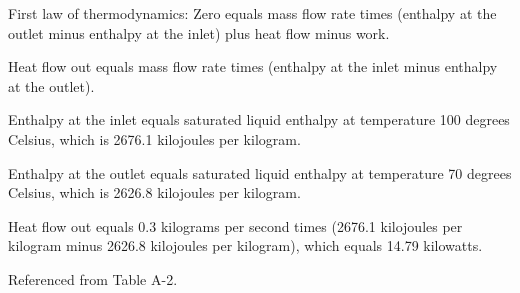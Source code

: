 First law of thermodynamics:  
Zero equals mass flow rate times (enthalpy at the outlet minus enthalpy at the inlet) plus heat flow minus work.  

Heat flow out equals mass flow rate times (enthalpy at the inlet minus enthalpy at the outlet).  

Enthalpy at the inlet equals saturated liquid enthalpy at temperature 100 degrees Celsius, which is 2676.1 kilojoules per kilogram.  

Enthalpy at the outlet equals saturated liquid enthalpy at temperature 70 degrees Celsius, which is 2626.8 kilojoules per kilogram.  

Heat flow out equals 0.3 kilograms per second times (2676.1 kilojoules per kilogram minus 2626.8 kilojoules per kilogram), which equals 14.79 kilowatts.  

Referenced from Table A-2.